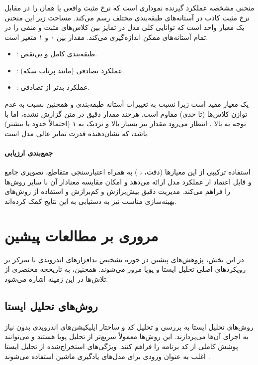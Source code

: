 \subsubsection{}
منحنی مشخصه عملکرد گیرنده  نموداری است که نرخ مثبت واقعی  یا همان  را در مقابل نرخ مثبت کاذب  در آستانه‌های طبقه‌بندی مختلف رسم می‌کند.
\lr{\[ \text{FPR} = \frac{\text{FP}}{\text{FP} + \text{TN}} \]}
مساحت زیر این منحنی  یک معیار واحد است که توانایی کلی مدل در تمایز بین کلاس‌های مثبت و منفی را در تمام آستانه‌های ممکن اندازه‌گیری می‌کند. مقدار  بین ۰ و ۱ متغیر است.
\begin{itemize}
    \renewcommand{\labelitemi}{\lr{$\bullet$}}
    \item {}: طبقه‌بندی کامل و بی‌نقص.
    \item {}: عملکرد تصادفی (مانند پرتاب سکه).
    \item {}: عملکرد بدتر از تصادفی.
\end{itemize}
 یک معیار مفید است زیرا نسبت به تغییرات آستانه طبقه‌بندی و همچنین نسبت به عدم توازن کلاس‌ها (تا حدی) مقاوم است. هرچند مقدار دقیق  در متن گزارش نشده، اما با توجه به  بالا ، انتظار می‌رود مقدار  نیز بسیار بالا و نزدیک به ۱ (احتمالاً حدود  یا بیشتر) باشد، که نشان‌دهنده قدرت تمایز عالی مدل  است.

\paragraph{جمع‌بندی ارزیابی}
استفاده ترکیبی از این معیارها (دقت، ، ) به همراه اعتبارسنجی متقاطع، تصویری جامع و قابل اعتماد از عملکرد مدل  ارائه می‌دهد و امکان مقایسه معنادار آن با سایر روش‌ها را فراهم می‌کند. مدیریت دقیق بیش‌برازش و کم‌برازش و استفاده از روش‌های بهینه‌سازی مناسب نیز به دستیابی به این نتایج کمک کرده‌اند.

\section{مروری بر مطالعات پیشین}
در این بخش، پژوهش‌های پیشین در حوزه تشخیص بدافزارهای اندرویدی با تمرکز بر رویکردهای اصلی تحلیل ایستا و پویا مرور می‌شوند. همچنین، به تاریخچه مختصری از تلاش‌ها در این زمینه اشاره می‌شود.

\subsection{روش‌های تحلیل ایستا}
روش‌های تحلیل ایستا  به بررسی و تحلیل کد و ساختار اپلیکیشن‌های اندرویدی بدون نیاز به اجرای آن‌ها می‌پردازند. این روش‌ها معمولاً سریع‌تر از تحلیل پویا هستند و می‌توانند پوشش کاملی از کد برنامه را فراهم کنند. ویژگی‌های استخراج‌شده از تحلیل ایستا اغلب به عنوان ورودی برای مدل‌های یادگیری ماشین استفاده می‌شوند \cite{AndroidMalwareSurvey}.

